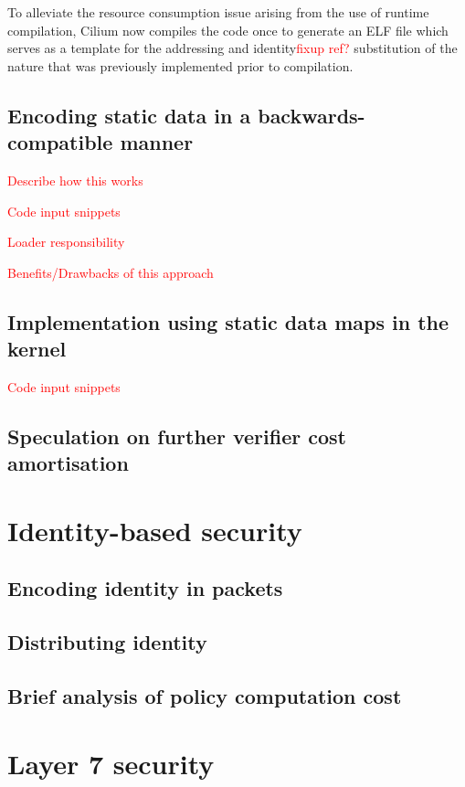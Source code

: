 \documentclass[10pt,sigconf,authorversion]{lpc}
\newcommand\todo[1]{\textcolor{red}{#1}}
\begin{document}
To alleviate the resource consumption issue arising from the use of runtime
compilation, Cilium now compiles the code once to generate an ELF file which
serves as a template for the addressing and identity\todo{fixup ref?}
substitution of the nature that was previously implemented prior to
compilation.

\subsection{Encoding static data in a backwards-compatible manner}

\todo{Describe how this works}

\todo{Code input snippets}

\todo{Loader responsibility}

\todo{Benefits/Drawbacks of this approach}

\subsection{Implementation using static data maps in the kernel}

\todo{Code input snippets}

\subsection{Speculation on further verifier cost amortisation}

\section{Identity-based security}

\subsection{Encoding identity in packets}

\subsection{Distributing identity}

\subsection{Brief analysis of policy computation cost}

\section{Layer 7 security}
\end{document}
